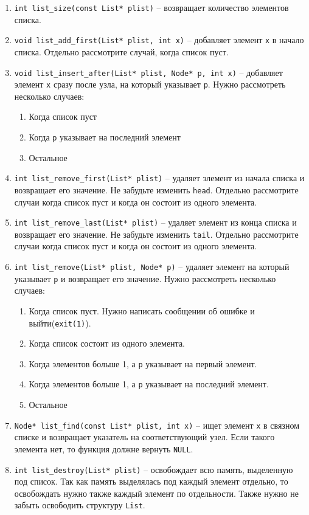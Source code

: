 \documentclass{article}
\begin{document}
\begin{enumerate}
\item \texttt{int list\_size(const List* plist)} -- возвращает количество элементов списка.
\item \texttt{void list\_add\_first(List* plist, int x)} -- добавляет элемент \texttt{x} в начало списка. Отдельно рассмотрите случай, когда список пуст.
\item \texttt{void list\_insert\_after(List* plist, Node* p, int x)} -- добавляет элемент \texttt{x} сразу после узла, на который указывает \texttt{p}. Нужно рассмотреть несколько случаев:
\begin{enumerate}
\item Когда список пуст
\item Когда \texttt{p} указывает на последний элемент
\item Остальное
\end{enumerate}
\item \texttt{int list\_remove\_first(List* plist)} -- удаляет элемент из начала списка и возвращает его значение. Не забудьте изменить \texttt{head}. Отдельно рассмотрите случаи когда список пуст и когда он состоит из одного элемента.
\item \texttt{int list\_remove\_last(List* plist)} -- удаляет элемент из конца списка и возвращает его значение. Не забудьте изменить \texttt{tail}. Отдельно рассмотрите случаи когда список пуст и когда он состоит из одного элемента.
\item \texttt{int list\_remove(List* plist, Node* p)} -- удаляет элемент на который указывает \texttt{p} и возвращает его значение. Нужно рассмотреть несколько случаев:
\begin{enumerate}
\item Когда список пуст. Нужно написать сообщении об ошибке и выйти(\texttt{exit(1)}).
\item Когда список состоит из одного элемента.
\item Когда элементов больше 1, а \texttt{p} указывает на первый элемент.
\item Когда элементов больше 1, а \texttt{p} указывает на последний элемент.
\item Остальное
\end{enumerate}

\item \texttt{Node* list\_find(const List* plist, int x)} -- ищет элемент \texttt{x} в связном списке и возвращает указатель на соответствующий узел. Если такого элемента нет, то функция должне вернуть \texttt{NULL}.
\item \texttt{int list\_destroy(List* plist)} -- освобождает всю память, выделенную под список. Так как память выделялась под каждый элемент отдельно, то освобождать нужно также каждый элемент по отдельности. Также нужно не забыть освободить структуру \texttt{List}.


\end{enumerate}
\end{document}
